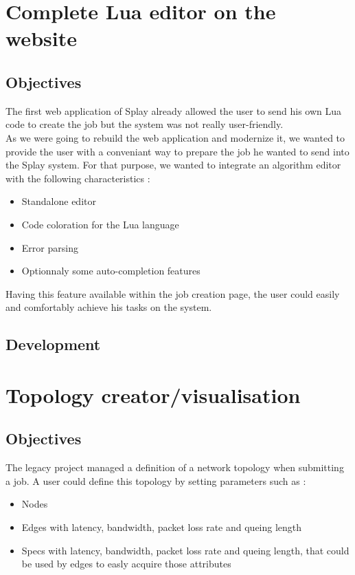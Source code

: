 \documentclass{eplmastersthesis}
\begin{document}
    \section{Complete Lua editor on the website}
      \subsection{Objectives}
        The first web application of Splay already allowed the user to send
        his own Lua code to create the job but the system was not really
        user-friendly.\\

        As we were going to rebuild the web application and modernize it,
        we wanted to provide the user with a conveniant way to prepare
        the job he wanted to send into the Splay system. For that purpose,
        we wanted to integrate an algorithm editor with the following
        characteristics :

        \begin{itemize}
          \item Standalone editor
          \item Code coloration for the Lua language
          \item Error parsing
          \item Optionnaly some auto-completion features
        \end{itemize}

        Having this feature available within the job creation page, the user
        could easily and comfortably achieve his tasks on the system.
      \subsection{Development}

    \section{Topology creator/visualisation}
      \subsection{Objectives}
        The legacy project managed a definition of a network topology when
        submitting a job. A user could define this topology by setting
        parameters such as :

        \begin{itemize}
          \item Nodes
          \item Edges with latency, bandwidth, packet loss rate and queing
          length
          \item Specs with latency, bandwidth, packet loss rate and queing
          length, that could be used by edges to easly acquire those
          attributes
        \end{itemize}
\end{document}
